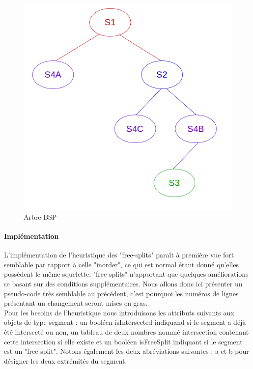 \documentclass[11pt,a4paper]{article}
\begin{document}
\begin{figure}[!h]
\centering
\includegraphics[scale=0.4]{free_splits_3.png}
\caption{Arbre BSP}
\label{split_bsp}
\end{figure}

\paragraph{Implémentation}

L'implémentation de l'heuristique des "free-splits" paraît à première vue fort semblable par rapport à celle "inorder", ce qui est normal étant donné qu'elles possèdent le même squelette, "free-splits" n'apportant que quelques améliorations se basant sur des conditions supplémentaires. Nous allons donc ici présenter un pseudo-code très semblable au précédent, c'est pourquoi les numéros de lignes présentant un changement seront mises en gras.\\

Pour les besoins de l'heuristique nous introduisons les attributs suivants aux objets de type segment : un booléen isIntersected indiquand si le segment a déjà été intersecté ou non, un tableau de deux nombres nommé intersection contenant cette intersection si elle existe et un booléen isFreeSplit indiquant si le segment est un "free-split". Notons également les deux abréviations suivantes : a et b pour désigner les deux extrémités du segment.\\
\end{document}

